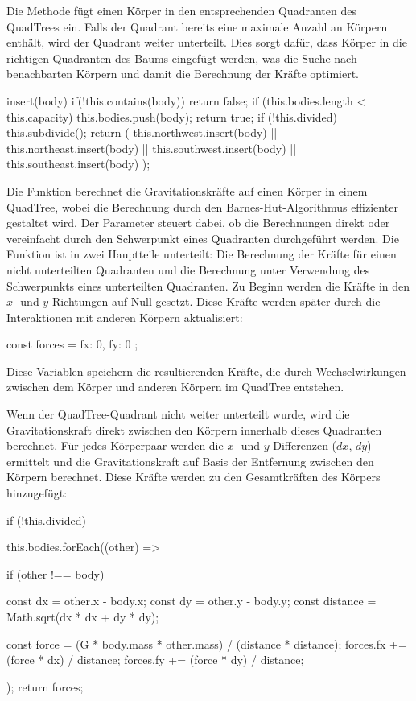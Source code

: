\documentclass[a4paper,12pt,twoside]{article}
\begin{document}
Die Methode  fügt einen Körper in den entsprechenden Quadranten des QuadTrees ein. Falls der Quadrant bereits eine maximale Anzahl an Körpern enthält, wird der Quadrant weiter unterteilt. Dies sorgt dafür, dass Körper in die richtigen Quadranten des Baums eingefügt werden, was die Suche nach benachbarten Körpern und damit die Berechnung der Kräfte optimiert.

\begin{javascript}
insert(body) {
    if(!this.contains(body)) return false;
    if (this.bodies.length < this.capacity) {
        this.bodies.push(body);
        return true;
    }
    if (!this.divided) this.subdivide();
    return (
        this.northwest.insert(body) ||
        this.northeast.insert(body) ||
        this.southwest.insert(body) ||
        this.southeast.insert(body)
    );
}
\end{javascript}


Die Funktion  berechnet die Gravitationskräfte auf einen Körper  in einem QuadTree, wobei die Berechnung durch den Barnes-Hut-Algorithmus effizienter gestaltet wird. Der Parameter  steuert dabei, ob die Berechnungen direkt oder vereinfacht durch den Schwerpunkt eines Quadranten durchgeführt werden. Die Funktion ist in zwei Hauptteile unterteilt: Die Berechnung der Kräfte für einen nicht unterteilten Quadranten und die Berechnung unter Verwendung des Schwerpunkts eines unterteilten Quadranten.
Zu Beginn werden die Kräfte in den \( x \)- und \( y \)-Richtungen auf Null gesetzt. Diese Kräfte werden später durch die Interaktionen mit anderen Körpern aktualisiert:

\begin{javascript}
const forces = { fx: 0, fy: 0 };
\end{javascript}

Diese Variablen speichern die resultierenden Kräfte, die durch Wechselwirkungen zwischen dem Körper und anderen Körpern im QuadTree entstehen.

Wenn der QuadTree-Quadrant nicht weiter unterteilt wurde, wird die Gravitationskraft direkt zwischen den Körpern innerhalb dieses Quadranten berechnet. Für jedes Körperpaar werden die \( x \)- und \( y \)-Differenzen (\( dx \), \( dy \)) ermittelt und die Gravitationskraft auf Basis der Entfernung zwischen den Körpern berechnet. Diese Kräfte werden zu den Gesamtkräften des Körpers hinzugefügt:

\begin{javascript}
if (!this.divided) {
    this.bodies.forEach((other) => {
        if (other !== body) {
            const dx = other.x - body.x;
            const dy = other.y - body.y;
            const distance = Math.sqrt(dx * dx + dy * dy);
            
            const force = (G * body.mass * other.mass) / (distance * distance);
            forces.fx += (force * dx) / distance;
            forces.fy += (force * dy) / distance;
        }
    });
    return forces;
}
\end{javascript}
\end{document}
